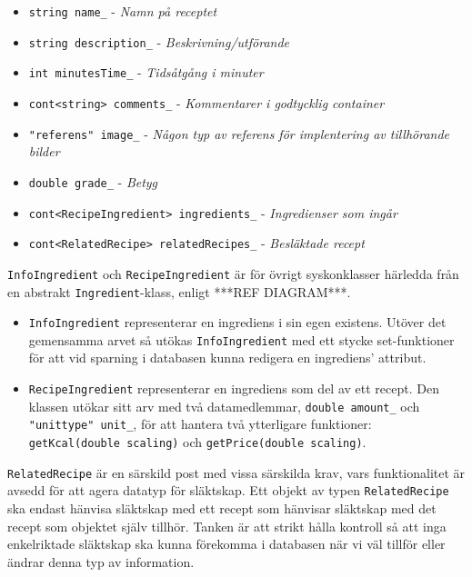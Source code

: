 \begin{itemize}
\item \verb+string name_+ - \emph{Namn på receptet}
\item \verb+string description_+ - \emph{Beskrivning/utförande}
\item \verb+int minutesTime_+ - \emph{Tidsåtgång i minuter}
\item \verb+cont<string> comments_+ - \emph{Kommentarer i godtycklig container}
\item \verb+"referens" image_+ - \emph{Någon typ av referens för implentering av tillhörande bilder}
\item \verb+double grade_+ - \emph{Betyg}
\end{itemize}

\begin{itemize}
\item \verb+cont<RecipeIngredient> ingredients_+ - \emph{Ingredienser som ingår}
\item \verb+cont<RelatedRecipe> relatedRecipes_+ - \emph{Besläktade recept}
\end{itemize}

\verb+InfoIngredient+ och \verb+RecipeIngredient+ är för övrigt syskonklasser härledda från en abstrakt \verb+Ingredient+-klass, enligt ***REF DIAGRAM***.

\begin{itemize}
\item \verb+InfoIngredient+ representerar en ingrediens i sin egen existens. Utöver det gemensamma arvet så utökas \verb+InfoIngredient+ med ett stycke set-funktioner för att vid sparning i databasen kunna redigera en ingrediens' attribut. 
\item \verb+RecipeIngredient+ representerar en ingrediens som del av ett recept. Den klassen utökar sitt arv med två datamedlemmar, \verb+double amount_+ och \verb+"unittype" unit_+, för att hantera två ytterligare funktioner: \verb+getKcal(double scaling)+ och \verb+getPrice(double scaling)+.
\end{itemize}
 
\verb+RelatedRecipe+ är en särskild post med vissa särskilda krav, vars funktionalitet är avsedd för att agera datatyp för släktskap. Ett objekt av typen \verb+RelatedRecipe+ ska endast hänvisa släktskap med ett recept som hänvisar släktskap med det recept som objektet själv tillhör. Tanken är att strikt hålla kontroll så att inga enkelriktade släktskap ska kunna förekomma i databasen när vi väl tillför eller ändrar denna typ av information.

